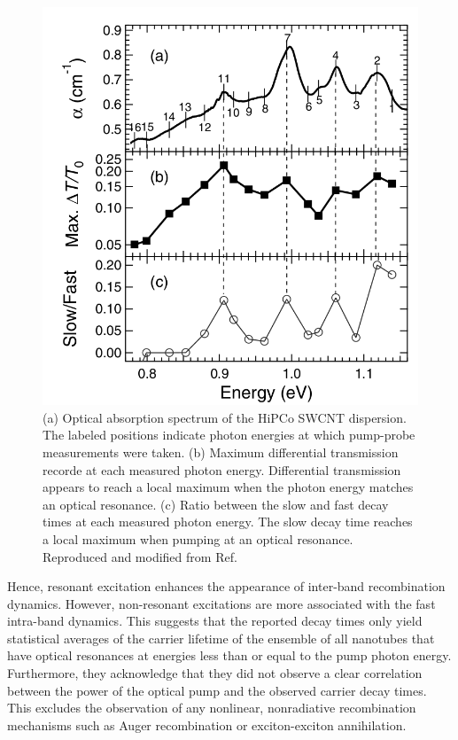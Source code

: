 \begin{figure}[ht]
	\centering
	\includegraphics[scale=0.3]{images/chapter_prior_works/wavelength_dependence_gordana}
	\caption{(a) Optical absorption spectrum of the HiPCo SWCNT dispersion. The labeled positions indicate photon energies at which pump-probe measurements were taken. (b) Maximum differential transmission recorde at each measured photon energy. Differential transmission appears to reach a local maximum when the photon energy matches an optical resonance. (c) Ratio between the slow and fast decay times at each measured photon energy. The slow decay time reaches a local maximum when pumping at an optical resonance. Reproduced and modified from Ref.\ \cite{ostojic2004interband}}
	\label{fig:wl_dep_gordana}
\end{figure}

Hence, resonant excitation enhances the appearance of inter-band recombination dynamics. However, non-resonant excitations are more associated with the fast intra-band dynamics. This suggests that the reported decay times only yield statistical averages of the carrier lifetime of the ensemble of all nanotubes that have optical resonances at energies less than or equal to the pump photon energy. Furthermore, they acknowledge that they did not observe a clear correlation between the power of the optical pump and the observed carrier decay times. This excludes the observation of any nonlinear, nonradiative recombination mechanisms such as Auger recombination or exciton-exciton annihilation.

